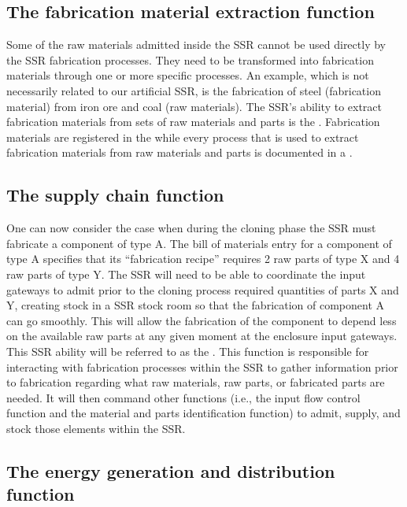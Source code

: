 \subsection[The fabrication material extraction function]{The fabrication material extraction function}

Some of the raw materials
admitted inside the SSR cannot be used directly by the SSR fabrication
processes. They need to be transformed into fabrication materials
through one or more specific processes. An example, which is not necessarily
related to our artificial SSR, is the fabrication
of steel (fabrication material) from iron ore and coal (raw materials). The SSR's ability to
extract fabrication materials from sets of raw materials and parts is
the .  Fabrication
materials are registered in the  
while every process that is used
to extract fabrication materials from raw materials and parts is
documented in a .

\subsection[The supply chain function]{The supply chain function}

One can now consider the case when during the
cloning phase the SSR must fabricate a component of type A.  The bill
of materials entry for a component of type A specifies that its
“fabrication recipe” requires 2 raw parts of type X and 4 raw parts of
type Y.  The SSR will need to be able to coordinate the input
gateways to admit prior to the cloning process required quantities of parts X and Y,
creating stock in a SSR stock room so that the fabrication of
component A can go smoothly.  This will allow the fabrication of the component to depend less 
on the available raw parts at any given moment at the enclosure input
gateways. This SSR ability will be referred to as the . 
This function is responsible for interacting with
fabrication processes within the SSR to gather information prior to
fabrication regarding what raw materials, raw parts, or fabricated
parts are needed. It will then command other functions (i.e., the input flow control function 
and the material and parts identification function) to admit, supply, and stock
those elements within the SSR.

\subsection[The energy generation and distribution function]{The energy generation and distribution function}


